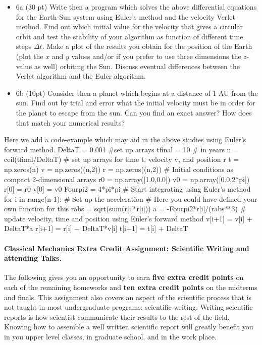 \documentclass[%
oneside,                 %
final,                   %
10pt]{article}
\begin{document}
\begin{itemize}
\item 6a (30 pt)  Write then a program which solves the above differential equations for the Earth-Sun system using Euler's  method and the velocity Verlet method.  Find out which initial value for the velocity that gives a circular orbit and test the stability of your algorithm as function of different time steps $\Delta t$.  Make a plot of the results you obtain for the position of the Earth (plot the $x$ and $y$ values and/or if you prefer to use three dimensions the $z$-value as well) orbiting  the Sun. Discuss eventual differences between the Verlet algorithm and the Euler algorithm. 

\item 6b (10pt) Consider then a planet which begins at a distance of 1 AU from the sun. Find out by trial and error what the initial velocity must be in order for the planet to escape from the sun.  Can you find an exact answer?  How does that match your numerical results?
\end{itemize}

\noindent
Here we add a code-example which may aid in the above studies using Euler's forward method.
\bpycod
DeltaT = 0.001
#set up arrays 
tfinal = 10 # in years
n = ceil(tfinal/DeltaT)
# set up arrays for time t, velocity v, and position r
t = np.zeros(n)
v = np.zeros((n,2))
r = np.zeros((n,2))
# Initial conditions as compact 2-dimensional arrays
r0 = np.array([1.0,0.0])
v0 = np.array([0.0,2*pi])
r[0] = r0
v[0] = v0
Fourpi2 = 4*pi*pi
# Start integrating using Euler's method
for i in range(n-1):
    # Set up the acceleration
    # Here you could have defined your own function for this
    rabs = sqrt(sum(r[i]*r[i]))
    a =  -Fourpi2*r[i]/(rabs**3)
    # update velocity, time and position using Euler's forward method
    v[i+1] = v[i] + DeltaT*a
    r[i+1] = r[i] + DeltaT*v[i]
    t[i+1] = t[i] + DeltaT
\epycod




\paragraph{Classical Mechanics Extra Credit Assignment: Scientific Writing and attending Talks.}
The following gives you an opportunity to earn \textbf{five extra credit
points} on each of the remaining homeworks and \textbf{ten extra credit points}
on the midterms and finals.  This assignment also covers an aspect of
the scientific process that is not taught in most undergraduate
programs: scientific writing.  Writing scientific reports is how
scientist communicate their results to the rest of the field.  Knowing
how to assemble a well written scientific report will greatly benefit
you in you upper level classes, in graduate school, and in the work
place.
\end{document}

